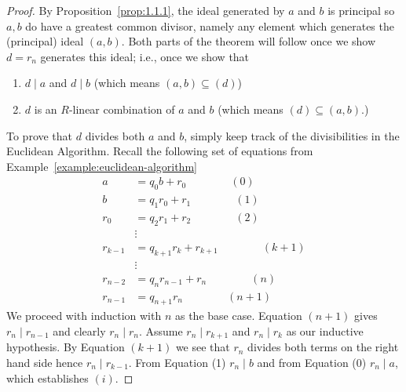         \begin{proof}
            By Proposition~\ref{prop:1.1.1}, the ideal generated by $a$ and $b$ is principal so $a,b$ do have a greatest common divisor, namely any element which generates the (principal) ideal $(a,b)$. Both parts of the theorem will follow once we show $d = r_n$ generates this ideal; i.e., once we show that
                \begin{enumerate}[label = (\roman*)]
                    \item $d \mid a$ and $d \mid b$ (which means $(a,b) \subseteq (d)$)
                    \item $d$ is an $R$-linear combination of $a$ and $b$ (which means $(d) \subseteq (a,b)$.)
                \end{enumerate}
            
            To prove that $d$ divides both $a$ and $b$, simply keep track of the divisibilities in the Euclidean Algorithm. Recall the following set of equations from Example~\ref{example:euclidean-algorithm}
            \begin{equation*}
                \begin{split}
                    a &= q_0 b + r_0 \quad\quad\quad\quad (0) \\
                    b &= q_1 r_0 + r_1 \quad\quad\quad\quad (1) \\
                    r_0 &= q_2 r_1 + r_2 \quad\quad\quad\quad (2) \\
                    & \vdots \\
                    r_{k-1} &= q_{k+1}r_k + r_{k+1} \quad\quad\quad\quad (k+1) \\
                    & \vdots \\
                    r_{n-2} &= q_{n} r_{n-1} + r_{n} \quad\quad\quad\quad (n) \\
                    r_{n-1} & = q_{n+1} r_{n} \quad\quad\quad\quad (n+1)
                \end{split}
                \end{equation*}
            We proceed with induction with $n$ as the base case. Equation $(n+1)$ gives $r_n \mid r_{n-1}$ and clearly $r_n \mid r_n$. Assume $r_n \mid r_{k+1}$ and $r_n \mid r_{k}$ as our inductive hypothesis. By Equation $(k+1)$ we see that $r_n$ divides both terms on the right hand side \textemdash hence $r_n \mid r_{k-1}$. From Equation (1) $r_n \mid b$ and from Equation (0) $r_n \mid a$, which establishes $(i)$.
        \end{proof}
